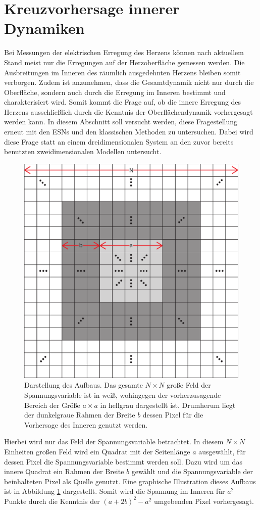 \clearpage
\section{Kreuzvorhersage innerer Dynamiken}
\label{sec:exp_inner_prediction}
Bei Messungen der elektrischen Erregung des Herzens können nach aktuellem Stand meist nur die Erregungen auf der Herzoberfläche gemessen werden. Die Ausbreitungen im Inneren des räumlich ausgedehnten Herzens bleiben somit verborgen. Zudem ist anzunehmen, dass die Gesamtdynamik nicht nur durch die Oberfläche, sondern auch durch die Erregung im Inneren bestimmt und charakterisiert wird. Somit kommt die Frage auf, ob die innere Erregung des Herzens ausschließlich durch die Kenntnis der Oberflächendynamik vorhergesagt werden kann. In diesem Abschnitt soll versucht werden, diese Fragestellung erneut mit den \textsc{ESN}s und den klassischen Methoden zu untersuchen. Dabei wird diese Frage statt an einem dreidimensionalen System an den zuvor bereits benutzten zweidimensionalen Modellen untersucht.\\

\begin{figure}[h]
	\centering
	\includegraphics[width=.6\linewidth]{figures/illustrations/inner_prediction.pdf}
	\caption{Darstellung des Aufbaus. Das gesamte $N \times N$ große Feld der Spannungsvariable ist in weiß, wohingegen der vorherzusagende Bereich der Größe $a \times a$ in hellgrau dargestellt ist. Drumherum liegt der dunkelgraue Rahmen der Breite $b$ dessen Pixel für die Vorhersage des Inneren genutzt werden.}
	\label{fig:exp_inner_prediction}
\end{figure}

Hierbei wird nur das Feld der Spannungsvariable betrachtet. In diesem $N \times N$ Einheiten großen Feld wird ein Quadrat mit der Seitenlänge $a$ ausgewählt, für dessen Pixel die Spannungsvariable bestimmt werden soll. Dazu wird um das innere Quadrat ein Rahmen der Breite $b$ gewählt und die Spannungsvariable der beinhalteten Pixel als Quelle genutzt. Eine graphische Illustration dieses Aufbaus ist in Abbildung \ref{fig:exp_inner_prediction} dargestellt. Somit wird die Spannung im Inneren für $a^2$ Punkte durch die Kenntnis der $(a+2b)^2-a^2$ umgebenden Pixel vorhergesagt.\\

